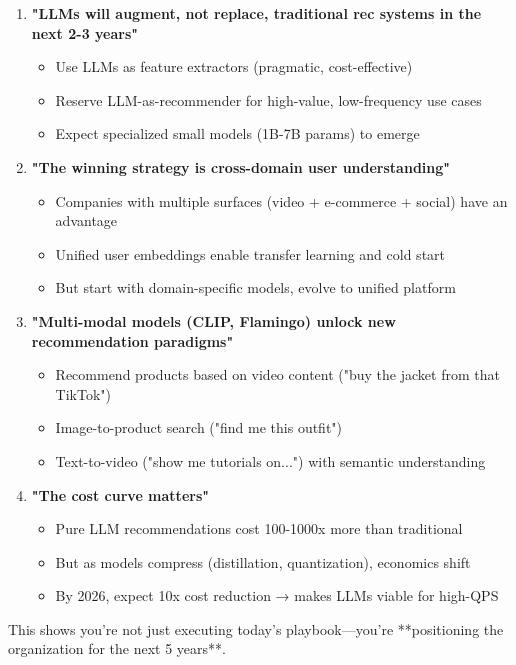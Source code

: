 \documentclass[10pt]{article}
\begin{document}
\begin{enumerate}
\item \textbf{"LLMs will augment, not replace, traditional rec systems in the next 2-3 years"}
\begin{itemize}
\item Use LLMs as feature extractors (pragmatic, cost-effective)
\item Reserve LLM-as-recommender for high-value, low-frequency use cases
\item Expect specialized small models (1B-7B params) to emerge
\end{itemize}

\item \textbf{"The winning strategy is cross-domain user understanding"}
\begin{itemize}
\item Companies with multiple surfaces (video + e-commerce + social) have an advantage
\item Unified user embeddings enable transfer learning and cold start
\item But start with domain-specific models, evolve to unified platform
\end{itemize}

\item \textbf{"Multi-modal models (CLIP, Flamingo) unlock new recommendation paradigms"}
\begin{itemize}
\item Recommend products based on video content ("buy the jacket from that TikTok")
\item Image-to-product search ("find me this outfit")
\item Text-to-video ("show me tutorials on...") with semantic understanding
\end{itemize}

\item \textbf{"The cost curve matters"}
\begin{itemize}
\item Pure LLM recommendations cost 100-1000x more than traditional
\item But as models compress (distillation, quantization), economics shift
\item By 2026, expect 10x cost reduction → makes LLMs viable for high-QPS
\end{itemize}
\end{enumerate}

This shows you're not just executing today's playbook—you're **positioning the organization for the next 5 years**.
\end{document}
